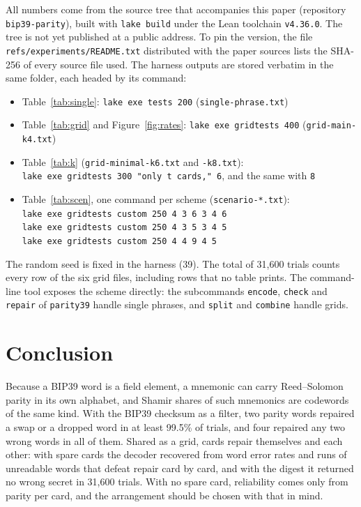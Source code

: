 \documentclass[numeric]{anvil-paper}
\newcommand{\code}[1]{\texttt{#1}}
\begin{document}
All numbers come from the source tree that accompanies this paper (repository
\code{bip39-parity}), built with \code{lake build} under the Lean toolchain
\code{v4.36.0}. The tree is not yet published at a public address. To pin the
version, the file \code{refs/experiments/README.txt} distributed with the paper
sources lists the SHA-256 of every source file used. The harness outputs are
stored verbatim in the same folder, each headed by its command:
\begin{itemize}
\item Table~\ref{tab:single}: \code{lake exe tests 200}
  (\code{single-phrase.txt})
\item Table~\ref{tab:grid} and Figure~\ref{fig:rates}:
  \code{lake exe gridtests 400} (\code{grid-main-k4.txt})
\item Table~\ref{tab:k} (\code{grid-minimal-k6.txt} and \code{-k8.txt}):\\
  \code{lake exe gridtests 300 "only t cards," 6}, and the same with \code{8}
\item Table~\ref{tab:scen}, one command per scheme
  (\code{scenario-*.txt}):\\
  \code{lake exe gridtests custom 250 4 3 6 3 4 6}\\
  \code{lake exe gridtests custom 250 4 3 5 3 4 5}\\
  \code{lake exe gridtests custom 250 4 4 9 4 5}
\end{itemize}
The random seed is fixed in the harness (39). The total of 31{,}600 trials counts every row
of the six grid files, including rows that no table prints. The command-line tool exposes the scheme directly: the
subcommands \code{encode}, \code{check} and \code{repair} of \code{parity39}
handle single phrases, and \code{split} and \code{combine} handle grids.

\section{Conclusion}
\label{sec:conclusion}

Because a BIP39 word is a field element, a mnemonic can carry Reed--Solomon
parity in its own alphabet, and Shamir shares of such mnemonics are codewords
of the same kind. With the BIP39 checksum as a filter, two parity words repaired a swap or a
dropped word in at least 99.5\% of trials, and four repaired any two wrong
words in all of them. Shared as a grid, cards repair themselves and each
other: with spare cards the decoder recovered from word error rates and runs
of unreadable words that defeat repair card by card, and with the digest it
returned no wrong secret in 31{,}600 trials. With no spare card, reliability
comes only from parity per card, and the arrangement should be chosen with
that in mind.



\end{document}
